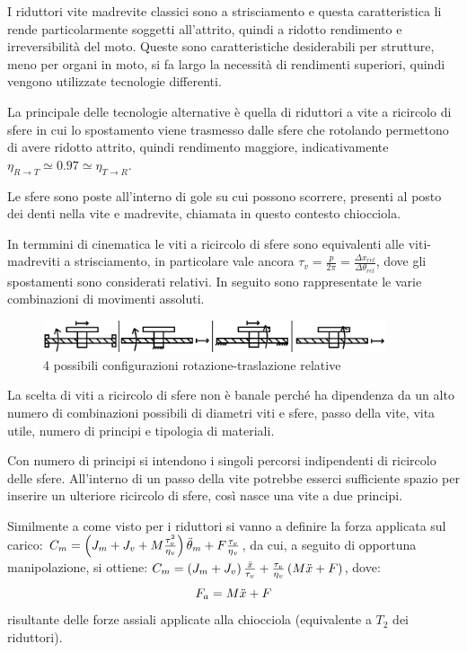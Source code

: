 I riduttori vite madrevite classici sono a strisciamento e questa caratteristica li rende particolarmente soggetti all'attrito, quindi a ridotto rendimento e irreversibilità del moto. Queste sono caratteristiche desiderabili per strutture, meno per organi in moto, si fa largo la necessità di rendimenti superiori, quindi vengono utilizzate tecnologie differenti.

La principale delle tecnologie alternative è quella di riduttori a vite a ricircolo di sfere in cui lo spostamento viene trasmesso dalle sfere che rotolando permettono di avere ridotto attrito, quindi rendimento maggiore, indicativamente \( \eta_{R\rightarrow T} \simeq 0.97 \simeq \eta_{T\rightarrow R} \).

Le sfere sono poste all'interno di gole su cui possono scorrere, presenti al posto dei denti nella vite e madrevite, chiamata in questo contesto chiocciola.

In termmini di cinematica le viti a ricircolo di sfere sono equivalenti alle viti-madreviti a strisciamento, in particolare vale ancora \( \tau_v = \frac{p}{2\pi} = \frac{\Delta x_{rel}}{\Delta \theta_{rel}} \), dove gli spostamenti sono considerati relativi.
In seguito sono rappresentate le varie combinazioni di movimenti assoluti.

\begin{figure}[h]
    \centering
    \includegraphics[width=0.9\textwidth]{Immagini/confi_din_vite_ricircolo.png}
    \caption{4 possibili configurazioni rotazione-traslazione relative}
\end{figure}

La scelta di viti a ricircolo di sfere non è banale perché ha dipendenza da un alto numero di combinazioni possibili di diametri viti e sfere, passo della vite, vita utile, numero di principi e tipologia di materiali.

Con numero di principi si intendono i singoli percorsi indipendenti di ricircolo delle sfere. All'interno di un passo della vite potrebbe esserci sufficiente spazio per inserire un ulteriore ricircolo di sfere, così nasce una vite a due principi.

Similmente a come visto per i riduttori si vanno a definire la forza applicata sul carico: \( C_m = \left( J_m + J_v + M \frac{\tau_v^2}{\eta_v} \right) \Ddot{\theta}_m + F \frac{\tau_v}{\eta_v} \), da cui, a seguito di opportuna manipolazione, si ottiene: \( C_m = \left(J_m + J_v\right) \frac{\Ddot x}{\tau_v} + \frac{\tau_v}{\eta_v} \left( M\Ddot x + F \right) \), dove:
\[ F_a = M\Ddot x + F \]
risultante delle forze assiali applicate alla chiocciola (equivalente a \( T_2 \) dei riduttori).

